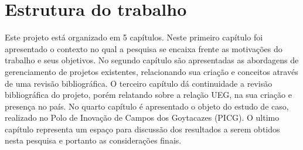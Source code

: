 \section{Estrutura do trabalho}

Este projeto está organizado em 5 capítulos. Neste primeiro capítulo foi apresentado o contexto no qual a pesquisa se encaixa frente as motivações do trabalho e seus objetivos.
No segundo capítulo são apresentadas as abordagens de gerenciamento de projetos existentes, relacionando sua criação e conceitos através de uma revisão bibliográfica.
O terceiro capítulo dá continuidade a revisão bibliográfica do projeto, porém relatando sobre a relação UEG, na sua criação e presença no país.
No quarto capítulo é apresentado o objeto do estudo de caso, realizado no Polo de Inovação de Campos dos Goytacazes (PICG).
O ultimo capítulo representa um espaço para discussão dos resultados a serem obtidos nesta pesquisa e portanto as considerações finais.

